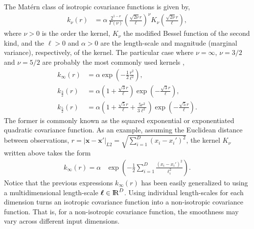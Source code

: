 The Mat\'ern class of isotropic covariance functions is given by, 
%
\begin{align*}
k_{\nu}(r)&=\alpha \, \frac{2^{1-\nu}}{\Gamma(\nu)}\left(\frac{\sqrt{2\nu}r}{\ell}\right)^{\!\nu} \! K_{\nu} \left(\frac{\sqrt{2\nu}r}{\ell}\right),
\end{align*}
%
where $\nu > 0$ is the order the kernel, $K_{\nu}$ the modified Bessel function of the second kind, and the $\ell > 0$ and $\alpha > 0$ are the length-scale and magnitude (marginal variance), respectively, of the kernel. The particular case where $\nu=\infty$, $\nu=3/2$ and $\nu=5/2$ are probably the most commonly used kernels \citep{rasmussen2006gaussian}, 
%
\begin{align*}
k_{\infty}(r)&=\alpha \exp \left( -\frac{1}{2} \frac{r^2}{\ell^2}\right),  \\
k_{\frac{3}{2}}(r)&=\alpha\left(1+\frac{\sqrt{3}r}{\ell}\right) \exp\! \left( -\frac{\sqrt{3}r}{\ell}\right),   \\
k_{\frac{5}{2}}(r)&=\alpha\left(1+\frac{\sqrt{5}r}{\ell} + \frac{5r^2}{3\ell^2}\right) \exp\! \left( -\frac{\sqrt{5}r}{\ell}\right). 
\end{align*}
%
The former is commonly known as the squared exponential or exponentiated quadratic covariance function. As an example, assuming the Euclidean distance between observations, $r=|\bm{x}-\bm{x}'|_{L2}=\sqrt{\sum_{i=1}^{D}(x_i-x_i')^2}$, the kernel $K_{\nu}$ written above takes the form
%
\begin{align*}
k_{\infty}(r) = \alpha & \exp \left( -\frac{1}{2} \sum_{i=1}^{D}\frac{(x_i-x_i')^2}{\ell_i^2}\right).
\end{align*}
%
Notice that the previous expressions $k_{\infty}(r)$ has been easily generalized to using a multidimensional length-scale $\bm{\ell}\in {\rm I\!R}^D$. Using individual length-scales for each dimension turns an isotropic covariance function into a non-isotropic covariance function. That is, for a non-isotropic covariance function, the smoothness may vary across different input dimensions. 

